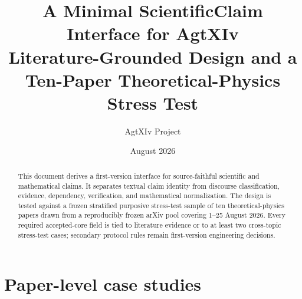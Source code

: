 \documentclass{article}
\title{A Minimal ScientificClaim Interface for AgtXIv\\\large Literature-Grounded Design and a Ten-Paper Theoretical-Physics Stress Test}
\author{AgtXIv Project}
\date{August 2026}
\begin{document}
\maketitle
\begin{abstract}
This document derives a first-version interface for source-faithful scientific and mathematical claims. It separates textual claim identity from discourse classification, evidence, dependency, verification, and mathematical normalization. The design is tested against a frozen stratified purposive stress-test sample of ten theoretical-physics papers drawn from a reproducibly frozen arXiv pool covering 1--25 August 2026. Every required accepted-core field is tied to literature evidence or to at least two cross-topic stress-test cases; secondary protocol rules remain first-version engineering decisions.
\end{abstract}
\tableofcontents









\appendix
\section{Paper-level case studies}\label{app:cases}












\end{document}
